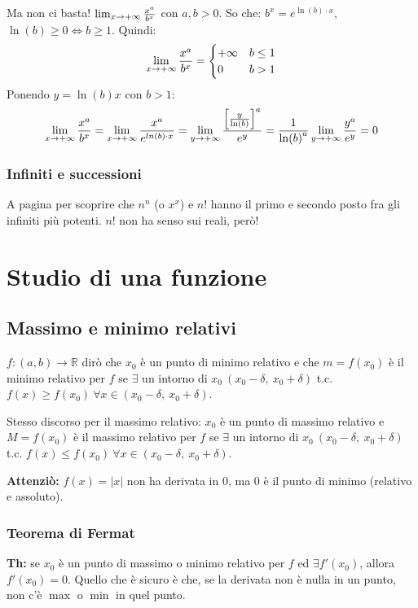 \documentclass[12pt,a4paper]{article}
\begin{document}
Ma non ci basta! $\lim_{x \to +\infty} {x^a \over b^x}$ con $a, b>0$.
So che:
$b^x = e^{\ln(b) \cdot x}$, $\ln(b) \geq 0 \Leftrightarrow b \geq 1$.
Quindi:
$$
\lim_{x \to +\infty} {x^a \over b^x} = 
\begin{cases} +\infty & b \leq 1 \\
0 & b > 1 \end{cases}
$$
Ponendo $y = \ln(b) x$ con $b > 1$:
$$
\lim_{x \to +\infty} {x^a \over b^x} = 
\lim_{x \to +\infty} {x^a \over e^{ln(b) \cdot x}} = 
\lim_{y \to +\infty} {{\left[ y \over \ln(b) \right]}^a \over e^y} = 
{1 \over {\ln(b)}^a} \lim_{y \to +\infty} {y^a \over e^y} = 0
$$

\subsubsection{Infiniti e successioni}
A pagina \pageref{fattoriale} per scoprire che $n^n$ (o $x^x$) e $n!$ 
hanno il primo e secondo posto fra gli infiniti pi\`u potenti. 
$n!$ non ha senso sui reali, per\`o!

\newpage
\section{Studio di una funzione}

\subsection{Massimo e minimo relativi}
$f: (a,b) \to \mathbb{R}$ dir\`o che $x_0$ \`e un punto di minimo relativo
e che $m = f(x_0)$ \`e il minimo relativo per $f$ se $\exists$ un intorno
di $x_0 \ (x_0 - \delta, \ x_0 + \delta)$ t.c. $f(x) \geq f(x_0) \ \forall
x \in (x_0 - \delta, \ x_0 + \delta)$.

Stesso discorso per il massimo relativo: $x_0$ \`e un punto di massimo relativo
e $M = f(x_0)$ \`e il massimo relativo per $f$ se $\exists$ un intorno
di $x_0 \ (x_0 - \delta, \ x_0 + \delta)$ t.c. $f(x) \leq f(x_0) \ \forall
x \in (x_0 - \delta, \ x_0 + \delta)$.

\textbf{Attenzi\`o:} $f(x) = |x|$ non ha derivata in $0$, ma $0$ \`e il punto
di minimo (relativo e assoluto). 

\subsubsection{Teorema di Fermat}
\textbf{Th:} se $x_0$ \`e un punto di massimo o minimo relativo per $f$ ed 
$\exists f'(x_0)$, allora $f'(x_0) = 0$. Quello che \`e sicuro \`e che,
se la derivata non \`e nulla in un punto, non c'\`e $\max$ o $\min$ in quel
punto.
\end{document}
